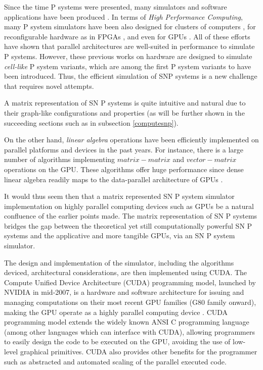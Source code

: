 \documentclass{svmultm}
\begin{document}
Since the time P systems were presented, many simulators and software applications have been produced \cite{swhandbook}. In terms of \textit{High Performance Computing}, many P system simulators have been also designed for clusters of computers \cite{CiWe04}, for reconfigurable hardware as in FPGAs \cite{nguyen}, and even for GPUs \cite{amgpu,satgpu}. All of these efforts have shown that parallel architectures are well-suited in performance to simulate P systems. However, these previous works on hardware are designed to simulate \textit{cell-like} P system variants, which are among the first P system variants to have been introduced. Thus, the efficient simulation of SNP systems is a new challenge that requires novel attempts.


A matrix representation of SN P systems is quite intuitive and natural due to their graph-like configurations and properties (as will be further shown in the succeeding sections such as in subsection \ref{computesnp}). 

{On the other hand, \textit{linear algebra} operations have been efficiently implemented on parallel platforms and devices in the past years. For instance, there is a large number of algorithms implementing $matrix-matrix$ and $vector-matrix$ operations on the GPU. These algorithms offer huge performance since dense linear algebra readily maps to the data-parallel architecture of GPUs \cite{matrixgpu1,matrixgpu2}}.

It would thus seem then that a matrix represented SN P system simulator implementation on highly parallel computing devices such as  {GPUs} be a natural confluence of the earlier points made. The matrix representation of SN P systems bridges the gap between the theoretical yet still computationally powerful SN P systems and the applicative and more tangible  {GPUs}, via an SN P system simulator. 

{The design and implementation of the simulator, including the algorithms deviced, architectural considerations, are then implemented using CUDA. The Compute Unified Device Architecture (CUDA) programming model, launched by NVIDIA in mid-2007, is a hardware and software architecture for issuing and managing computations on their most recent GPU families (G80 family onward), making the GPU operate as a highly parallel computing device \cite{cudapage}. CUDA programming model extends the widely known ANSI C programming language (among other languages which can interface with CUDA), allowing programmers to easily design the code to be executed on the GPU, avoiding the use of low-level graphical primitives. CUDA also provides other benefits for the programmer such as abstracted and automated scaling of the parallel executed code.}
\end{document}
